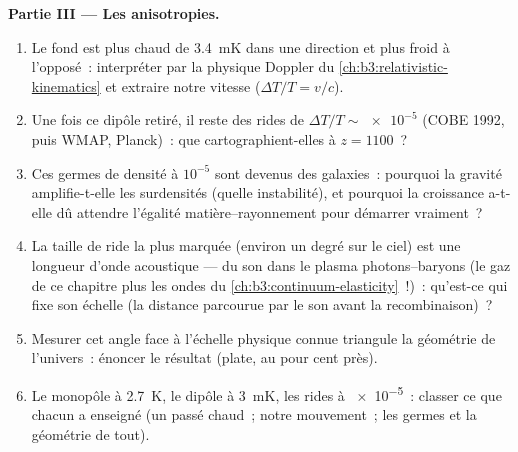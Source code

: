 \begin{problem}
\medskip\noindent\textbf{Partie III --- Les anisotropies.}
\begin{enumerate}[resume]
  \item Le fond est plus chaud de \qty{3.4}{mK} dans une direction
        et plus froid à l'opposé~: interpréter par la physique
        Doppler du \cref{ch:b3:relativistic-kinematics} et extraire
        notre vitesse ($\Delta T/T = v/c$).
  \item Une fois ce dipôle retiré, il reste des rides de $\Delta T/T \sim
        \num{e-5}$ (COBE 1992, puis WMAP, Planck)~: que
        cartographient-elles à $z = 1100$~?
  \item Ces germes de densité à $10^{-5}$ sont devenus des
        galaxies~: pourquoi la gravité amplifie-t-elle les
        surdensités (quelle instabilité), et pourquoi la croissance
        a-t-elle dû attendre l'égalité matière--rayonnement pour
        démarrer vraiment~?
  \item La taille de ride la plus marquée (environ un degré sur le
        ciel) est une longueur d'onde acoustique --- du son dans le
        plasma photons--baryons (le gaz de ce chapitre plus les
        ondes du \cref{ch:b3:continuum-elasticity}~!)~: qu'est-ce
        qui fixe son échelle (la distance parcourue par le son
        avant la recombinaison)~?
  \item Mesurer cet angle face à l'échelle physique connue
        triangule la géométrie de l'univers~: énoncer le résultat
        (plate, au pour cent près).
  \item Le monopôle à \qty{2.7}{K}, le dipôle à \qty{3}{mK}, les
        rides à \num{e-5}~: classer ce que chacun a enseigné (un
        passé chaud~; notre mouvement~; les germes et la géométrie
        de tout).
\end{enumerate}


\end{problem}
